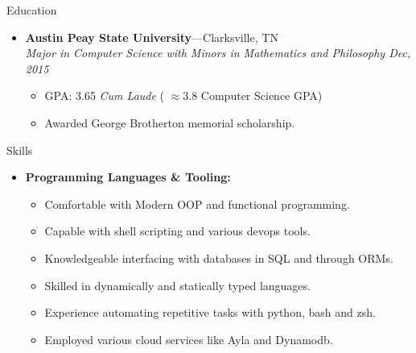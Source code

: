 \documentclass[11pt,oneside]{article}
\newenvironment{ressection}[1]{
	\vspace{4pt}
	{\fontfamily{phv}\selectfont\Large#1}
	\begin{itemize}
	\vspace{3pt}
}{
	\end{itemize}
}
\newcommand{\resitem}[1]{
	\vspace{-4pt}
	\item \begin{flushleft} #1 \end{flushleft}
}
\newcommand{\ressubitem}[1]{
	\vspace{-1pt}
	\item \begin{flushleft} #1 \end{flushleft}
}
\newcommand{\resbigitem}[3]{
	\vspace{-5pt}
	\item
	\textbf{#1}---#2 \\
	\textit{#3}
}
\newenvironment{ressubsec}[3]{
	\resbigitem{#1}{#2}{#3}
	\vspace{-2pt}
	\begin{itemize}
}{
	\end{itemize}
}
\newenvironment{reslist}[1]{
	\resitem{\textbf{#1}}
	\vspace{-5pt}
	\begin{itemize}
}{
	\end{itemize}
}
\begin{document}
\begin{ressection}{Education}

	\begin{ressubsec}{Austin Peay State University}{Clarksville, TN}{Major in Computer Science with Minors in Mathematics and Philosophy Dec, 2015}
		\ressubitem{GPA: 3.65 \textit{Cum Laude} ( $\approx 3.8$ Computer Science GPA)}
		\ressubitem{Awarded George Brotherton memorial scholarship.}
	\end{ressubsec}
\end{ressection}

\begin{ressection}{Skills}
	\begin{reslist}{Programming Languages \& Tooling:}
		\ressubitem{Comfortable with Modern OOP and functional programming.}
		\ressubitem{Capable with shell scripting and various devops tools.}
		\ressubitem{Knowledgeable interfacing with databases in SQL and through ORMs.}
		\ressubitem{Skilled in dynamically and statically typed languages. } 
		\ressubitem{Experience automating repetitive tasks with python, bash and zsh.}
		\ressubitem{Employed various cloud services like Ayla and Dynamodb.} 
\end{reslist}
\end{ressection}
\end{document}
